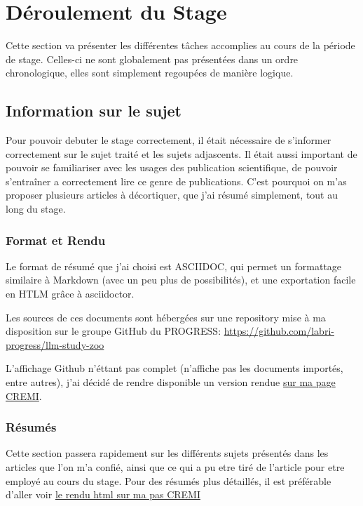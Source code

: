 \chapter{Déroulement du Stage}
\label{main}

Cette section va présenter les différentes tâches accomplies au cours de la période de stage.
Celles-ci ne sont globalement pas présentées dans un ordre chronologique, elles sont simplement regoupées de manière logique.


\section{Information sur le sujet}

Pour pouvoir debuter le stage correctement, il était nécessaire de s'informer correctement sur le sujet traité et les sujets adjascents.
Il était aussi important de pouvoir se familiariser avec les usages des publication scientifique, de pouvoir s'entraîner a correctement
lire ce genre de publications.
C'est pourquoi on m'as proposer plusieurs articles à décortiquer, que j'ai résumé simplement, tout au long du stage.

\subsection{Format et Rendu}

Le format de résumé que j'ai choisi est ASCIIDOC, qui permet un formattage similaire à Markdown (avec un peu plus de possibilités), et une exportation facile en HTLM grâce à asciidoctor.

Les sources de ces documents sont hébergées sur une repository mise à ma disposition sur le groupe GitHub du PROGRESS:
\url{https://github.com/labri-progress/llm-study-zoo}

L'affichage Github n'éttant pas complet (n'affiche pas les documents importés, entre autres), j'ai décidé de rendre disponible un version rendue
\href{https://maxime-pico.emi.u-bordeaux.fr/stage-labri/llm-study-zoo/}{sur ma page CREMI}.


\subsection{Résumés}

Cette section passera rapidement sur les différents sujets présentés dans les articles que l'on m'a confié, ainsi que ce qui a pu etre tiré de l'article pour etre employé au cours du stage.
Pour des résumés plus détaillés, il est préférable d'aller voir \href{https://maxime-pico.emi.u-bordeaux.fr/stage-labri/llm-study-zoo/}{le rendu html sur ma pas CREMI}


